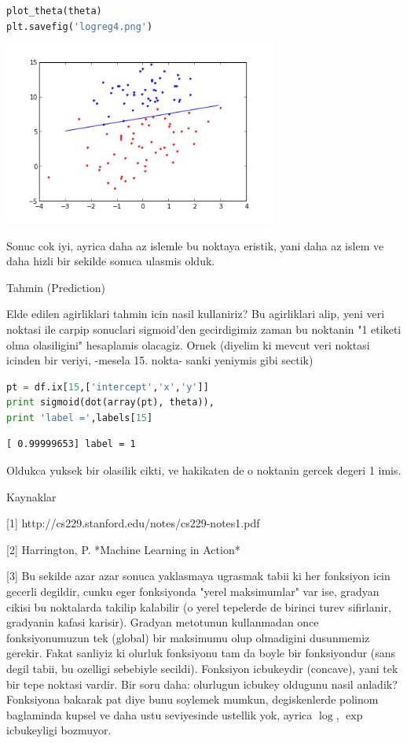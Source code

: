 \documentclass[12pt,fleqn]{article}\usepackage{../common}
\begin{document}
\begin{lstlisting}[language=Python]
plot_theta(theta)
plt.savefig('logreg4.png')
\end{lstlisting}

\includegraphics[height=6cm]{logreg4.png}

Sonuc cok iyi, ayrica daha az islemle bu noktaya eristik, yani daha
az islem ve daha hizli bir sekilde sonuca ulasmis olduk.

Tahmin (Prediction)

Elde edilen agirliklari tahmin icin nasil kullaniriz? Bu agirliklari
alip, yeni veri noktasi ile carpip sonuclari sigmoid'den gecirdigimiz
zaman bu noktanin "1 etiketi olma olasiligini" hesaplamis
olacagiz. Ornek (diyelim ki mevcut veri noktasi icinden bir veriyi,
-mesela 15. nokta- sanki yeniymis gibi sectik)

\begin{lstlisting}[language=Python]
pt = df.ix[15,['intercept','x','y']]
print sigmoid(dot(array(pt), theta)), 
print 'label =',labels[15]
\end{lstlisting}

\begin{verbatim}
[ 0.99999653] label = 1
\end{verbatim}

Oldukca yuksek bir olasilik cikti, ve hakikaten de o noktanin gercek
degeri 1 imis.

Kaynaklar

[1] http://cs229.stanford.edu/notes/cs229-notes1.pdf

[2] Harrington, P. *Machine Learning in Action*

[3] Bu sekilde azar azar sonuca yaklasmaya ugrasmak tabii ki her
fonksiyon icin gecerli degildir, cunku eger fonksiyonda "yerel
maksimumlar" var ise, gradyan cikisi bu noktalarda takilip kalabilir
(o yerel tepelerde de birinci turev sifirlanir, gradyanin kafasi
karisir). Gradyan metotunun kullanmadan once fonksiyonumuzun tek
(global) bir maksimumu olup olmadigini dusunmemiz gerekir. Fakat
sanliyiz ki olurluk fonksiyonu tam da boyle bir fonksiyondur (sans
degil tabii, bu ozelligi sebebiyle secildi). Fonksiyon icbukeydir
(concave), yani tek bir tepe noktasi vardir. Bir soru daha: olurlugun
icbukey oldugunu nasil anladik?  Fonksiyona bakarak pat diye bunu
soylemek mumkun, degiskenlerde polinom baglaminda kupsel ve daha ustu
seviyesinde ustellik yok, ayrica $\log$, $\exp$ icbukeyligi bozmuyor.
\end{document}
